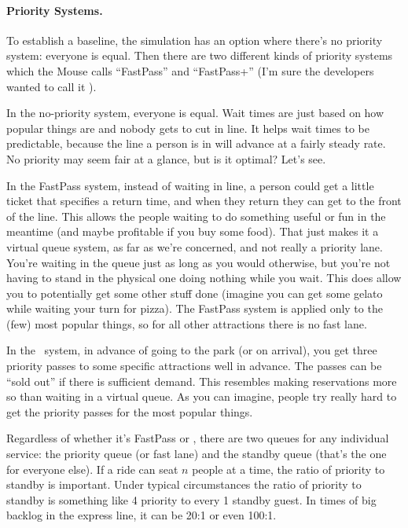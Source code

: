 \paragraph{Priority Systems.}
To establish a baseline, the simulation has an option where there's no priority system: everyone is equal. Then there are two different kinds of priority systems which the Mouse calls ``FastPass'' and ``FastPass+'' (I'm sure the developers wanted to call it \FPP).

In the no-priority system, everyone is equal. Wait times are just based on how popular things are and nobody gets to cut in line. It helps wait times to be predictable, because the line a person is in will advance at a fairly steady rate. No priority may seem fair at a glance, but is it optimal? Let's see. 

In the FastPass system, instead of waiting in line, a person could get a little ticket that specifies a return time, and when they return they can get to the front of the line. This allows the people waiting to do something useful or fun in the meantime (and maybe profitable if you buy some food). That just makes it a virtual queue system, as far as we're concerned, and not really a priority lane. You're waiting in the queue just as long as you would otherwise, but you're not having to stand in the physical one doing nothing while you wait. This does allow you to potentially get some other stuff done (imagine you can get some gelato while waiting your turn for pizza). The FastPass system is applied only to the (few) most popular things, so for all other attractions there is no fast lane. 

In the \FPP~system, in advance of going to the park (or on arrival), you get three priority passes to some specific attractions well in advance. The passes can be ``sold out'' if there is sufficient demand. This resembles making reservations more so than waiting in a virtual queue. As you can imagine, people try really hard to get the priority passes for the most popular things.

Regardless of whether it's FastPass or \FPP, there are two queues for any individual service: the priority queue (or fast lane) and the standby queue (that's the one for everyone else). If a ride can seat $n$ people at a time, the ratio of priority to standby is important. Under typical circumstances the ratio of priority to standby is something like 4 priority to every 1 standby guest. In times of big backlog in the express line, it can be 20:1 or even 100:1.

